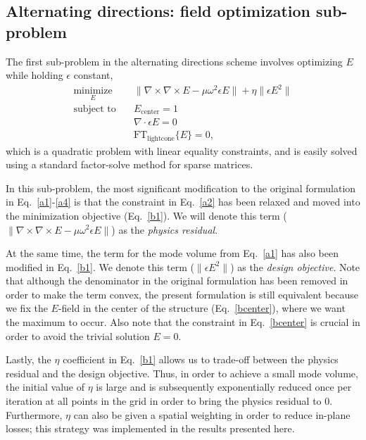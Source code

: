 \documentclass[10pt,letterpaper]{article}
\begin{document}
\subsection{Alternating directions: field optimization sub-problem}
The first sub-problem in the alternating directions scheme involves optimizing $E$ while holding $\epsilon$ constant,
\begin{align}
\underset{E}{\text{minimize}} \quad& \|\nabla\times\nabla\times E - \mu\omega^2\epsilon E\|
    + \eta \|\epsilon E^2\| \label{b1}\\ 
\text{subject to} \quad 
    & E_\text{center} = 1 \label{bcenter} \\
    & \nabla\cdot\epsilon E = 0 \label{bdiv}\\
    & \text{FT}_\text{lightcone}\{E\} = 0, \label{bQ}
\end{align}
which is a quadratic problem with linear equality constraints, and is easily solved using a standard factor-solve method for sparse matrices\cite{cholmod}.

In this sub-problem, the most significant modification to the original formulation in Eq.~\ref{a1}-\ref{a4} is that the constraint in Eq.~\ref{a2} has been relaxed and moved into the minimization objective (Eq.~\ref{b1}). We will denote this term ($\|\nabla\times\nabla\times E - \mu\omega^2\epsilon E\|$) as the \emph{physics residual}. 

At the same time, the term for the mode volume from Eq.~\ref{a1} has also been modified in Eq.~\ref{b1}. We denote this term ($\|\epsilon E^2\|$) as the \emph{design objective}. Note that although the denominator in the original formulation has been removed in order to make the term convex, the present formulation is still equivalent because we fix the $E$-field in the center of the structure (Eq.~\ref{bcenter}), where we want the maximum to occur. Also note that the constraint in Eq.~\ref{bcenter} is crucial in order to avoid the trivial solution $E=0$.

Lastly, the $\eta$ coefficient in Eq.~\ref{b1} allows us to trade-off between the physics residual and the design objective. Thus, in order to achieve a small mode volume, the initial value of $\eta$ is large and is subsequently exponentially reduced once per iteration at all points in the grid in order to bring the physics residual to 0. Furthermore, $\eta$ can also be given a spatial weighting in order to reduce in-plane losses; this strategy was implemented in the results presented here.
\end{document}
